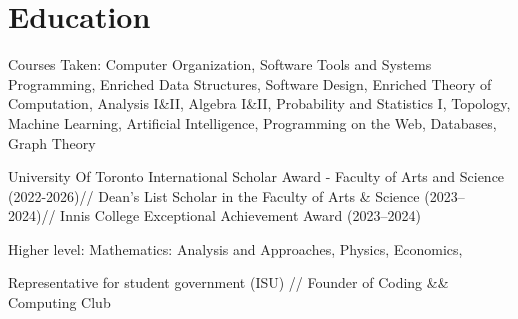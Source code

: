 \documentclass[letterpaper,10pt]{article}
\begin{document}

    \section{Education}

        \begin{resume_list}
            \item Courses Taken: Computer Organization, Software Tools and Systems Programming, Enriched Data Structures, Software Design, Enriched Theory of Computation, %
            Analysis I\&II, Algebra I\&II, Probability and Statistics I, Topology, Machine Learning, Artificial Intelligence, Programming on the Web, Databases, Graph Theory
            \item University Of Toronto International Scholar Award - Faculty of Arts and Science (2022-2026)//
            Dean’s List Scholar in the Faculty of Arts \& Science (2023--2024)//
            Innis College Exceptional Achievement Award (2023--2024)
        \end{resume_list}
    \vspace{5pt} 
    \begin{resume_list}
        \item Higher level: Mathematics: Analysis and Approaches, 
        Physics, Economics, 
        \item Representative for student government (ISU) // Founder of Coding \&\& Computing Club
    \end{resume_list}


\end{document}
